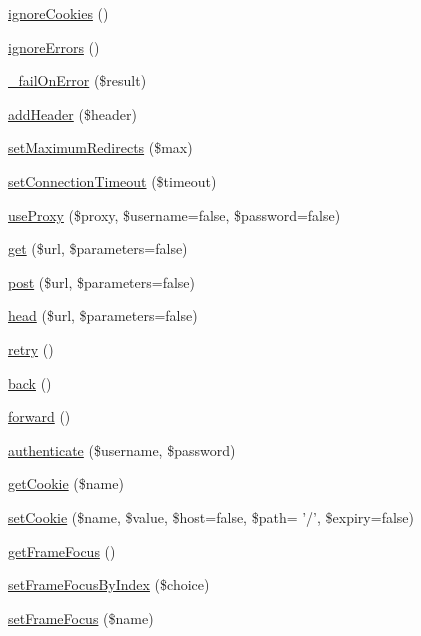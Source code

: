 \begin{DoxyCompactItemize}
\item 
\hyperlink{class_web_test_case_a0f36074331d50bcc7ea4bfe1c522f130}{ignoreCookies} ()
\item 
\hyperlink{class_web_test_case_a6aface34c4d09b7340bda88c72468056}{ignoreErrors} ()
\item 
\hyperlink{class_web_test_case_aa1a77c000c079da166026abda36dffc5}{\_\-failOnError} (\$result)
\item 
\hyperlink{class_web_test_case_a8580ffac71f2d312784b87faa9452bdc}{addHeader} (\$header)
\item 
\hyperlink{class_web_test_case_a1a94a628582b9cdb0610ee5772c0c5b9}{setMaximumRedirects} (\$max)
\item 
\hyperlink{class_web_test_case_a8e7e4de35b6b6e4f8a3139709f975193}{setConnectionTimeout} (\$timeout)
\item 
\hyperlink{class_web_test_case_aa05541e229c6ef1b31a51028cf08c92d}{useProxy} (\$proxy, \$username=false, \$password=false)
\item 
\hyperlink{class_web_test_case_a754f1efbaf6d5fb23208f2e823d37887}{get} (\$url, \$parameters=false)
\item 
\hyperlink{class_web_test_case_a7d409a4e22876ab2b96ee330c0bedc8c}{post} (\$url, \$parameters=false)
\item 
\hyperlink{class_web_test_case_af774376bbbcf017378dbec675015a760}{head} (\$url, \$parameters=false)
\item 
\hyperlink{class_web_test_case_ae8327032083ec6211ad823c45cb72084}{retry} ()
\item 
\hyperlink{class_web_test_case_a76f85e79d4ff8679a869af826186c6e9}{back} ()
\item 
\hyperlink{class_web_test_case_a3bcb61ac6efd4894ca22a702859191df}{forward} ()
\item 
\hyperlink{class_web_test_case_a09a9ef390ae02778cfab67678d72db62}{authenticate} (\$username, \$password)
\item 
\hyperlink{class_web_test_case_a104b5a93fe99f66cef9c170066e4c19e}{getCookie} (\$name)
\item 
\hyperlink{class_web_test_case_ab874157186e2bc2c9d5610f007618ed9}{setCookie} (\$name, \$value, \$host=false, \$path= '/', \$expiry=false)
\item 
\hyperlink{class_web_test_case_ab099bbb517810122d6a94889dc8541ad}{getFrameFocus} ()
\item 
\hyperlink{class_web_test_case_afbcb7ba0d00c5df36698d2669d90cd9c}{setFrameFocusByIndex} (\$choice)
\item 
\hyperlink{class_web_test_case_a82a0b459aa100c3a67eec773c6e5b39d}{setFrameFocus} (\$name)

\end{DoxyCompactItemize}
